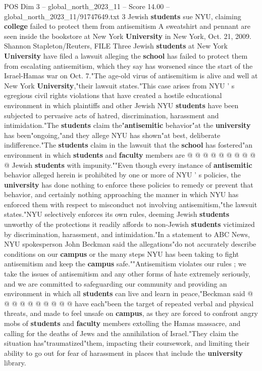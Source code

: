 \begin{textsample}{POS Dim 3 – global\_north\_2023\_11 – Score 14.00 – global\_north\_2023\_11/91747649.txt}  \label{ex:f3_pos_182}
3 Jewish \textbf{students} sue NYU, claiming \textbf{college} failed to protect them from antisemitism A sweatshirt and pennant are seen inside the bookstore at New York \textbf{University} in New York, Oct. 21, 2009.
Shannon Stapleton/Reuters, FILE Three Jewish \textbf{students} at New York \textbf{University} have filed a lawsuit alleging the \textbf{school} has failed to protect them from escalating antisemitism, which they say has worsened since the start of the Israel-Hamas war on Oct. 7."The age-old virus of antisemitism is alive and well at New York \textbf{University},"their lawsuit states."This case arises from NYU ' s egregious civil rights violations that have created a hostile educational environment in which plaintiffs and other Jewish NYU \textbf{students} have been subjected to pervasive acts of hatred, discrimination, harassment and intimidation."The \textbf{students} claim the"\textbf{antisemitic} behavior"at the \textbf{university} has been"ongoing,"and they allege NYU has shown"at best, deliberate indifference."The \textbf{students} claim in the lawsuit that the \textbf{school} has fostered"an environment in which \textbf{students} and \textbf{faculty} members are @ @ @ @ @ @ @ @ @ @ Jewish \textbf{students} with impunity.""Even though every instance of \textbf{antisemitic} behavior alleged herein is prohibited by one or more of NYU ' s policies, the \textbf{university} has done nothing to enforce these policies to remedy or prevent that behavior, and certainly nothing approaching the manner in which NYU has enforced them with respect to misconduct not involving antisemitism,"the lawsuit states."NYU selectively enforces its own rules, deeming Jewish \textbf{students} unworthy of the protections it readily affords to non-Jewish \textbf{students} victimized by discrimination, harassment, and intimidation."In a statement to ABC News, NYU spokesperson John Beckman said the allegations"do not accurately describe conditions on our \textbf{campus} or the many steps NYU has been taking to fight antisemitism and keep the \textbf{campus} safe.""Antisemitism violates our rules ; we take the issues of antisemitism and any other forms of hate extremely seriously, and we are committed to safeguarding our community and providing an environment in which all \textbf{students} can live and learn in peace,"Beckman said @ @ @ @ @ @ @ @ @ @ have each"been the target of repeated verbal and physical threats, and made to feel unsafe on \textbf{campus}, as they are forced to confront angry mobs of \textbf{students} and \textbf{faculty} members extolling the Hamas massacre, and calling for the deaths of Jews and the annihilation of Israel."They claim the situation has"traumatized"them, impacting their coursework, and limiting their ability to go out for fear of harassment in places that include the \textbf{university} library.

\end{textsample}
